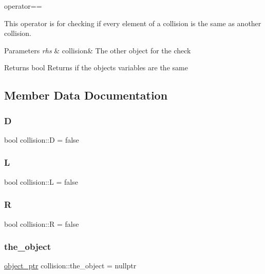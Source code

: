 operator== 

This operator is for checking if every element of a collision is the same as another collision.


\begin{DoxyParams}{Parameters}
{\em rhs} & collision\& The other object for the check \\
\hline
\end{DoxyParams}
\begin{DoxyReturn}{Returns}
bool Returns if the objects variables are the same 
\end{DoxyReturn}


\subsection{Member Data Documentation}
\mbox{\label{structcollision_a650a2bb40b437483c892b299c21920e8}} 
\subsubsection{\texorpdfstring{D}{D}}
{\footnotesize\ttfamily bool collision\+::D = false}

\mbox{\label{structcollision_ae07e40f8555ca518bf68ab3d85fcdb8e}} 
\subsubsection{\texorpdfstring{L}{L}}
{\footnotesize\ttfamily bool collision\+::L = false}

\mbox{\label{structcollision_a89956863ae123b47eaf477b785a60a58}} 
\subsubsection{\texorpdfstring{R}{R}}
{\footnotesize\ttfamily bool collision\+::R = false}

\mbox{\label{structcollision_a7ed36890448403a8a50bf90565255e42}} 
\subsubsection{\texorpdfstring{the\+\_\+object}{the\_object}}
{\footnotesize\ttfamily \hyperlink{drawable_8hpp_aab5add95f06d2ba25dbfed8eb07274fa}{object\+\_\+ptr} collision\+::the\+\_\+object = nullptr}

